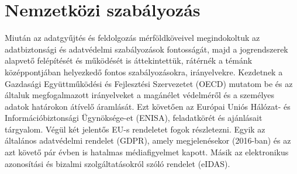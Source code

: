 \chapter{Nemzetközi szabályozás}

Miután az adatgyűjtés és feldolgozás mérföldköveivel megindokoltuk az adatbiztonsági és adatvédelmi szabályozások fontosságát, majd a jogrendszerek alapvető felépítését és működését is áttekintettük, rátérnék a témánk középpontjában helyezkedő fontos szabályozásokra, irányelvekre. Kezdetnek a Gazdasági Együttműködési és Fejlesztési Szervezetet (OECD) mutatom be és az általuk megfogalmazott irányelveket a magánélet védelméről és a személyes adatok határokon átívelő áramlását. Ezt követően az Európai Uniós Hálózat- és Információbiztonsági Ügynöksége-et (ENISA), feladatkörét és ajánlásait tárgyalom. Végül két jelentős EU-s rendeletet fogok részletezni. Egyik az általános adatvédelmi rendelet (GDPR), amely megjelenésekor (2016-ban) és az azt követő pár évben is hatalmas médiafigyelmet kapott. Másik az elektronikus azonosítási és bizalmi szolgáltatásokról szóló rendelet (eIDAS).




